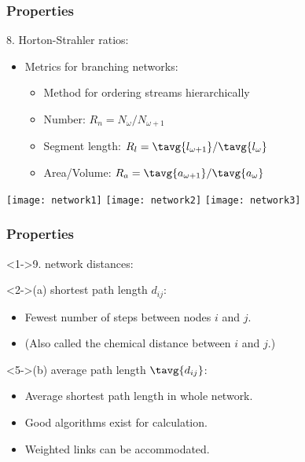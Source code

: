 \begin{frame}
  \frametitle{Properties}

  \begin{block}{8. Horton-Strahler ratios:}
    \begin{itemize}
    \item<1-> Metrics for branching networks:
      \begin{itemize}
      \item<2-> Method for ordering streams hierarchically
      \item<3->
        Number: $R_n = N_{\omega}/N_{\omega+1}$ 
      \item<4->
        Segment length: $R_l = \tavg{l_{\omega+1}}/\tavg{l_{\omega}}$ 
      \item<5->
        Area/Volume: $R_a = \tavg{a_{\omega+1}}/\tavg{a_{\omega}}$ 
      \end{itemize}
    \end{itemize}
    \begin{overprint}
      \begin{center}
        \texttt{[image: network1]}%
        \texttt{[image: network2]} 
        \texttt{[image: network3]}%
      \end{center}
    \end{overprint}
  \end{block}

\end{frame}

\begin{frame}
  \frametitle{Properties}

  \begin{block}<1->{9. network distances:}
    \begin{block}<2->{\alert{(a) shortest path length $d_{ij}$:}}
      \begin{itemize}
      \item <3->Fewest number of steps between nodes $i$ and $j$.      
      \item <4->(Also called the chemical distance between $i$ and $j$.)
      \end{itemize}
    \end{block}
    \begin{block}<5->{\alert{(b) average path length $\tavg{d_{ij}}$:}}
      \begin{itemize}
      \item <6-> Average shortest path length in whole network.
      \item <7-> 
        Good algorithms exist for calculation.
      \item <8->
        Weighted links can be accommodated.
      \end{itemize}
    \end{block}

  \end{block}

\end{frame}

